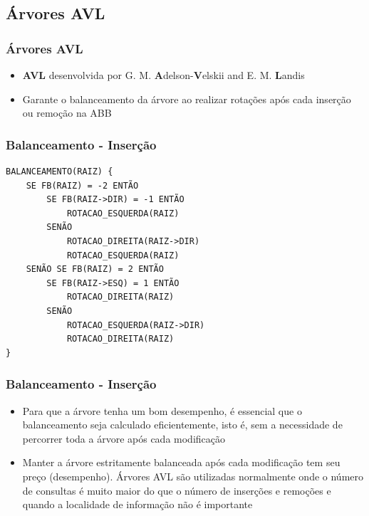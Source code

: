 \subsection{Árvores AVL}

\begin{frame}
    \frametitle{Árvores AVL}
    
    \begin{itemize}
    \item \textbf{AVL} desenvolvida por G. M. \textbf{A}delson-\textbf{V}elskii and E. M. \textbf{L}andis
    \item Garante o balanceamento da árvore ao realizar rotações após cada inserção ou remoção na ABB
    \end{itemize}
\end{frame}

\begin{frame}[fragile]
\frametitle{Balanceamento - Inserção}
\begin{verbatim}
BALANCEAMENTO(RAIZ) {
    SE FB(RAIZ) = -2 ENTÃO
        SE FB(RAIZ->DIR) = -1 ENTÃO
            ROTACAO_ESQUERDA(RAIZ)
        SENÃO
            ROTACAO_DIREITA(RAIZ->DIR)
            ROTACAO_ESQUERDA(RAIZ)
    SENÃO SE FB(RAIZ) = 2 ENTÃO
        SE FB(RAIZ->ESQ) = 1 ENTÃO
            ROTACAO_DIREITA(RAIZ)
        SENÃO
            ROTACAO_ESQUERDA(RAIZ->DIR)
            ROTACAO_DIREITA(RAIZ)
}
\end{verbatim}
\end{frame}

\begin{frame}[fragile]
\frametitle{Balanceamento - Inserção}

\begin{itemize}
\item Para que a árvore tenha um bom desempenho, é essencial que o balanceamento seja
calculado eficientemente, isto é, sem a necessidade de percorrer toda a árvore após cada
modificação
\item Manter a árvore estritamente balanceada após cada modificação tem seu preço (desempenho).
Árvores AVL são utilizadas normalmente onde o número de consultas é muito maior do que o número de inserções
e remoções e quando a localidade de informação não é importante
\end{itemize}
\end{frame}

